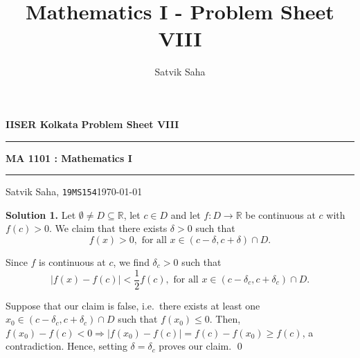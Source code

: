 \documentclass[10pt]{article}
\title{Mathematics I - Problem Sheet VIII}
\author{Satvik Saha}
\date{}
\begin{document}
        \par\textbf{IISER Kolkata} \hfill \textbf{Problem Sheet VIII}
        \vspace{3pt}
        \hrule
        \vspace{3pt}
        \begin{center}
                \LARGE{\textbf{MA 1101 : Mathematics I}}
        \end{center}
        \vspace{3pt}
        \hrule
        \vspace{3pt}
        Satvik Saha, \texttt{19MS154}\hfill\today
        \vspace{20pt}

        \textbf{Solution 1.}
        Let $\emptyset \neq D \subseteq \mathbb{R}$, let $c \in D$ and let $f\colon D \to \mathbb{R}$ be continuous at $c$ with $f(c) > 0$.
        We claim that there exists $\delta > 0$ such that \[f(x) > 0, \text{ for all } x \in (c - \delta, c + \delta) \cap D.\]

        Since $f$ is continuous at $c$, we find $\delta_c > 0$ such that
        \[|f(x) - f(c)| < \frac{1}{2}f(c), \text{ for all } x \in (c - \delta_c, c + \delta_c) \cap D.\]

        Suppose that our claim is false, i.e.\ there exists at least one $x_0 \in (c - \delta_c, c + \delta_c) \cap D$ such that $f(x_0) \le 0$.
        Then, $f(x_0) - f(c) < 0 \Rightarrow |f(x_0) - f(c)| = f(c) - f(x_0) \ge f(c)$, a contradiction.
        Hence, setting $\delta = \delta_c$ proves our claim. \qed\\
        
\end{document}

